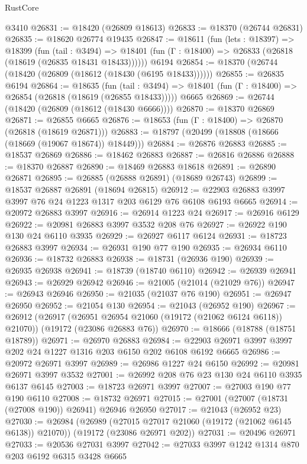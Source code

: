 \begin{lexlean}{RustCore}
\begin{coremodule}
    @3410
@26831 := @18420 (@26809 @18613)
@26833 := @18370 (@26744 @26831)
@26835 := @18620 @26774 @19435
@26847 := @18611
    (fun (lets : @18397) =>
    @18399
      (fun (tail : @3494) =>
      @18401 (fun (Γ : @18400) => @26833 (@26818 (@18619 (@26835 @18431 @18433))))))
    @6194
@26854 := @18370 (@26744 (@18420 (@26809 (@18612 (@18430 (@6195 @18433))))))
@26855 := @26835 @6194
@26864 := @18635
    (fun (tail : @3494) => @18401 (fun (Γ : @18400) => @26854 (@26818 (@18619 (@26855 @18433)))))
    @6665
@26869 := @26744 (@18420 (@26809 (@18612 (@18430 @6666))))
@26870 := @18370 @26869
@26871 := @26855 @6665
@26876 := @18653 (fun (Γ : @18400) => @26870 (@26818 (@18619 @26871)))
@26883 := @18797 (@20499 (@18808 (@18666 (@18669 (@19067 @18674)) @18449)))
@26884 := @26876 @26883
@26885 := @18537 @26869
@26886 := @18462 @26883
@26887 := @26816 @26886
@26888 := @18370 @26887
@26890 := @18469 @26883 @18618
@26891 := @26890 @26871
@26895 := @26885 (@26888 @26891) (@18689 @26743)
@26899 := @18537 @26887 @26891 (@18694 @26815)
@26912 := @22903 @26883 @3997 @3997 @76 @24 @1223 @1317 @203 @6129 @76 @6108 @6193 @6665
@26914 := @20972 @26883 @3997
@26916 := @26914 @1223 @24
@26917 := @26916 @6129
@26922 := @20981 @26883 @3997 @3532 @208 @76
@26927 := @26922 @190 @130 @24 @6110 @3935
@26929 := @26927 @6117 @6124
@26931 := @18723 @26883 @3997
@26934 := @26931 @190 @77 @190
@26935 := @26934 @6110
@26936 := @18732 @26883
@26938 := @18731 (@26936 @190)
@26939 := @26935 @26938
@26941 := @18739 (@18740 @6110)
@26942 := @26939 @26941
@26943 := @26929 @26942
@26946 := @21005 (@21014 (@21029 @76))
@26947 := @26943 @26946
@26950 := @21035 (@21037 @76 @190)
@26951 := @26947 @26950
@26952 := @21054 @130
@26954 := @21043 (@26952 @190)
@26967 := @26912
    (@26917 (@26951 @26954 @21060 (@19172 (@21062 @6124 @6118)) @21070))
    (@19172 (@23086 @26883 @76))
@26970 := @18666 (@18788 (@18751 @18789))
@26971 := @26970 @26883
@26984 := @22903 @26971 @3997 @3997 @202 @24 @1227 @1316 @203 @6150 @202 @6108 @6192 @6665
@26986 := @20972 @26971 @3997
@26989 := @26986 @1227 @24 @6150
@26992 := @20981 @26971 @3997 @3532
@27001 := @26992 @208 @76 @23 @130 @24 @6110 @3935 @6137 @6145
@27003 := @18723 @26971 @3997
@27007 := @27003 @190 @77 @190 @6110
@27008 := @18732 @26971
@27015 := @27001 (@27007 (@18731 (@27008 @190)) @26941) @26946 @26950
@27017 := @21043 (@26952 @23)
@27030 := @26984
    (@26989 (@27015 @27017 @21060 (@19172 (@21062 @6145 @6138)) @21070))
    (@19172 (@23086 @26971 @202))
@27031 := @20496 @26971
@27033 := @20536 @27031 @3997
@27042 := @27033 @3997 @1242 @1314 @870 @203 @6192 @6315 @3428 @6665

\end{coremodule}
\end{lexlean}

